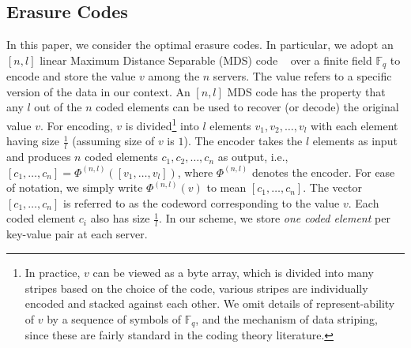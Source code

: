 
\subsection{Erasure Codes}
In this paper, we consider the optimal erasure codes. In particular, we adopt an $[n, l]$  linear Maximum Distance Separable (MDS) code ~\cite{verapless_book} over a finite field $\mathbb{F}_q$ to encode and store the value $v$ among the $n$ servers. The value refers to a specific version of the data in our context. An $[n, l]$ MDS code has the property that any $l$ out of the $n$ coded elements can be used to recover (or decode) the original value $v$. 
For encoding, $v$ is divided\footnote{In practice, $v$ can be viewed as a byte array, which is divided into many stripes based on the choice of the code, various stripes are individually encoded and stacked against each other. We omit details of represent-ability of $v$ by a sequence of symbols of $\mathbb{F}_q$, and the mechanism of data striping, since these are fairly standard in the coding theory literature.} into $l$ elements $v_1, v_2, \ldots, v_l$ with each element having  size $\frac{1}{l}$ (assuming size of $v$ is $1$). The encoder takes the $l$ elements as input and produces $n$ coded elements $c_1, c_2, \ldots, c_n$ as output, i.e., $[c_1, \ldots, c_n] = \Phi^{(n,l)}([v_1, \ldots, v_l])$, where $\Phi^{(n, l)}$ denotes the encoder. For ease of notation, we simply write $\Phi^{(n, l)}(v)$ to mean  $[c_1, \ldots, c_n]$. The vector $[c_1, \ldots, c_n]$ is  referred to as the codeword corresponding to the value $v$. Each coded element $c_i$ also has  size $\frac{1}{l}$. In our scheme, we store \textit{one coded element} per key-value pair at each server. 

